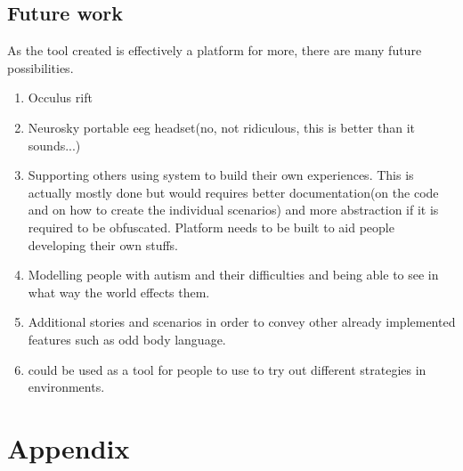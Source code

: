 \documentclass[11pt]{report}
\begin{document}
\section{Future work}

As the tool created is effectively a platform for more, there are many future possibilities. 
\begin{enumerate}
\item Occulus rift
\item Neurosky portable eeg headset(no, not ridiculous, this is better than it sounds...)
\item Supporting others using system to build their own experiences. This is actually mostly done but would requires better documentation(on the code and on how to create the individual scenarios) and more abstraction if it is required to be obfuscated. Platform needs to be built to aid people developing their own stuffs. 
\item Modelling people with autism and their difficulties and being able to see in what way the world effects them. 
\item Additional stories and scenarios in order to convey other already implemented features such as odd body language. 
\item could be used as a tool for people to use to try out different strategies in environments. 
\end{enumerate}

\chapter{Appendix}
\end{document}
